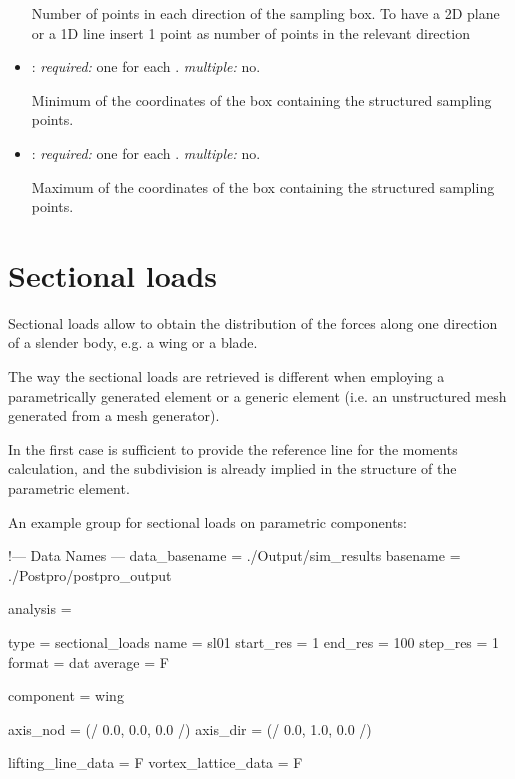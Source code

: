 \begin{itemize}
Number of points in each direction of the sampling box. To have a 2D plane or a 1D 
line insert 1 point as number of points in the relevant direction

\item {}: \textit{required:} one for each . 
\textit{multiple:} no.

Minimum of the coordinates of the box containing the structured sampling points.

\item {}: \textit{required:} one for each . 
\textit{multiple:} no.

Maximum of the coordinates of the box containing the structured sampling points.

\end{itemize}

\section{Sectional loads}

Sectional loads allow to obtain the distribution of the forces along one 
direction of a slender body, e.g. a wing or a blade. 

The way the sectional loads are retrieved is different when employing a 
parametrically generated element or a generic element 
(i.e. an unstructured mesh generated from a mesh generator). 

In the first case is sufficient to provide the reference line for the 
moments calculation, and the subdivision is already implied in the structure 
of the parametric element. 

An example  group for sectional loads on parametric components:

\begin{inputfile}[frame=single, caption={dust\_post.in for sectional load 
  on parametric components}, label={file:dust_post.in_sectional_param}]
!--- Data Names ---
data_basename = ./Output/sim_results
basename =     ./Postpro/postpro_output

analysis = {

type = sectional_loads
name = sl01
start_res = 1
end_res   = 100 
step_res  = 1
format = dat
average = F

component = wing

axis_nod = (/ 0.0, 0.0, 0.0 /)
axis_dir = (/ 0.0, 1.0, 0.0 /)

lifting_line_data = F
vortex_lattice_data = F
}
\end{inputfile}

